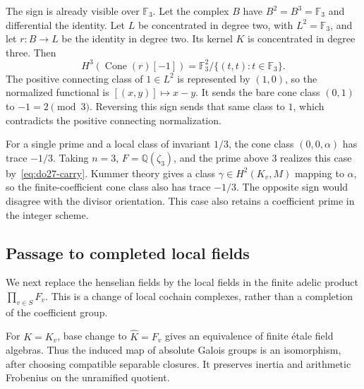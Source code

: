 The sign is already visible over \(\mathbb F_3\). Let the complex
\(B\) have \(B^2=B^3=\mathbb F_3\) and differential the identity.
Let \(L\) be concentrated in degree two, with \(L^2=\mathbb F_3\),
and let \(r:B\to L\) be the identity in degree two. Its kernel
\(K\) is concentrated in degree three. Then
\[
 H^3(\operatorname{Cone}(r)[-1])
   =\mathbb F_3^2/\{(t,t):t\in\mathbb F_3\}.
\]
The positive connecting class of \(1\in L^2\) is represented by
\((1,0)\), so the normalized functional is \([(x,y)]\mapsto x-y\).
It sends the bare cone class \((0,1)\) to \(-1=2\pmod3\).
Reversing this sign sends that same class to \(1\), which contradicts
the positive connecting normalization.

For a single prime and a local class of invariant \(1/3\), the
cone class \((0,0,\alpha)\) has trace \(-1/3\).
Taking \(n=3\), \(F=\mathbb Q(\zeta_3)\), and the prime
above \(3\) realizes this case by~\eqref{eq:do27-carry}. Kummer theory gives a
class \(\gamma\in H^2(K_v,M)\) mapping to \(\alpha\), so the
finite-coefficient cone class also has trace \(-1/3\).
The opposite sign would disagree with the divisor orientation.
This case also retains a coefficient prime in the integer scheme.

\subsection{Passage to completed local fields}

We next replace the henselian fields by the local fields in the
finite adelic product \(\prod_{v\in S}F_v\).
This is a change of local cochain complexes, rather than a completion
of the coefficient group.

\begin{lemma}
\label{lem:do27-completion}
For \(K=K_v\), base change to \(\widehat K=F_v\) gives an
equivalence of finite \'etale field algebras. Thus the induced map of
absolute Galois groups is an isomorphism, after choosing compatible
separable closures. It preserves inertia and arithmetic Frobenius
on the unramified quotient.
\end{lemma}

